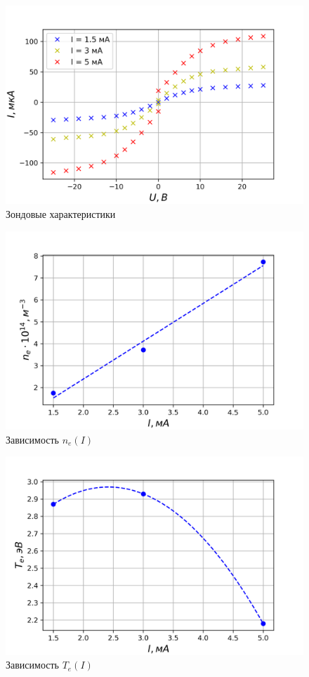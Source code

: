 \documentclass[a4paper, 12pt]{article}
\begin{document}
\begin{figure}[h!]
\begin{center}
\includegraphics{Zond_all.png}
\end{center}
\caption{Зондовые характеристики}
\label{Zond_all_graph}
\end{figure}

\begin{figure}[h!]
\begin{center}
\includegraphics{n_e(Ip).png}
\end{center}
\caption{Зависимость $n_e(I)$}
\label{n_e(I)}
\end{figure}

\begin{figure}[h!]
\begin{center}
\includegraphics{T_e(Ip).png}
\end{center}
\caption{Зависимость $T_e(I)$}
\label{T_e(I)}
\end{figure}
\end{document}
